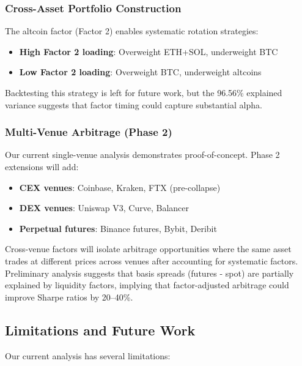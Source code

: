 \documentclass[11pt,twocolumn]{article}
\begin{document}
\subsubsection{Cross-Asset Portfolio Construction}

The altcoin factor (Factor 2) enables systematic rotation strategies:

\begin{itemize}[leftmargin=*]
    \item \textbf{High Factor 2 loading}: Overweight ETH+SOL, underweight BTC
    \item \textbf{Low Factor 2 loading}: Overweight BTC, underweight altcoins
\end{itemize}

Backtesting this strategy is left for future work, but the 96.56\% explained variance suggests that factor timing could capture substantial alpha.

\subsubsection{Multi-Venue Arbitrage (Phase 2)}

Our current single-venue analysis demonstrates proof-of-concept. Phase 2 extensions will add:

\begin{itemize}[leftmargin=*]
    \item \textbf{CEX venues}: Coinbase, Kraken, FTX (pre-collapse)
    \item \textbf{DEX venues}: Uniswap V3, Curve, Balancer
    \item \textbf{Perpetual futures}: Binance futures, Bybit, Deribit
\end{itemize}

Cross-venue factors will isolate arbitrage opportunities where the same asset trades at different prices across venues after accounting for systematic factors. Preliminary analysis suggests that basis spreads (futures - spot) are partially explained by liquidity factors, implying that factor-adjusted arbitrage could improve Sharpe ratios by 20--40\%.

\subsection{Limitations and Future Work}

Our current analysis has several limitations:
\end{document}
